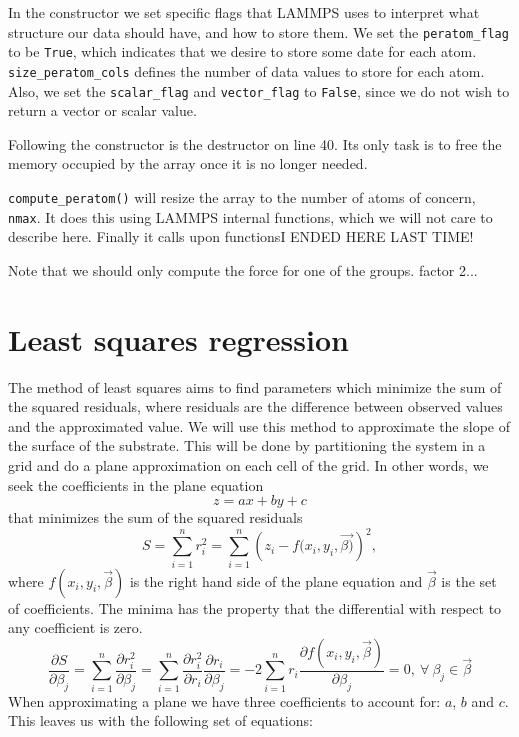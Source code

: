\documentclass[twoside,english]{uiofysmaster}
\newcommand\lr[1]{\left(#1\right)}
\begin{document}
In the constructor we set specific flags that LAMMPS uses to interpret what structure our data should have, and how to store them. 
We set the \texttt{peratom\_flag} to be \texttt{True}, which indicates that we desire to store some date for each atom. 
\texttt{size\_peratom\_cols} defines the number of data values to store for each atom. 
Also, we set the \texttt{scalar\_flag} and \texttt{vector\_flag} to \texttt{False}, since we do not wish to return a vector or scalar value.

Following the constructor is the destructor on line 40. Its only task is to free the memory occupied by the array once it is no longer needed.  

\texttt{compute\_peratom()} will resize the array to the number of atoms of concern, \texttt{nmax}. It does this using LAMMPS internal functions, which we will not care to describe here. Finally it calls upon functions{\huge  I ENDED HERE LAST TIME!}

{\color{editColor}Note that we should only compute the force for one of the groups. factor 2...}
\newpage
\section{Least squares regression}
The method of least squares aims to find parameters which  minimize the sum of the squared residuals, where residuals are the difference between observed values and the approximated value. We will use this method to approximate the slope of the surface of the substrate. This will be done by partitioning the system in a grid and do a plane approximation on each cell of the grid. In other words, we seek the coefficients in the plane equation
\begin{equation}
	z = ax + by + c
	\label{planeEquation}
\end{equation}
that minimizes the sum of the squared residuals
\begin{equation}
	S = \sum_{i=1}^{n} r_i^2 = \sum_{i=1}^{n} \lr{z_i - f(x_i, y_i, \vec{\beta)}}^2,
	\label{leastSquaresPlane}
\end{equation}
where $f(x_i,y_i,\vec{\beta})$ is the right hand side of the plane equation and $\vec{\beta}$ is the set of coefficients.
The minima has the property that the differential with respect to any coefficient is zero. 
\begin{equation}
	\frac{\partial S}{\partial \beta_j} 
	=  \sum_{i=1}^{n}\frac{\partial r_i^2}{\partial \beta_j} 
	=  \sum_{i=1}^{n}\frac{\partial r_i^2}{\partial r_i} \frac{\partial r_i}{\partial \beta_j} 
	= -2 \sum_{i=1}^{n}r_i\frac{\partial f(x_i,y_i, \vec{\beta})}{\partial \beta_j}
	= 0 , ~\forall ~\beta_j \in \vec{\beta}
\end{equation}
When approximating a plane we have three coefficients to account for: $a$, $b$ and $c$. This leaves us with the following set of equations:
\end{document}
